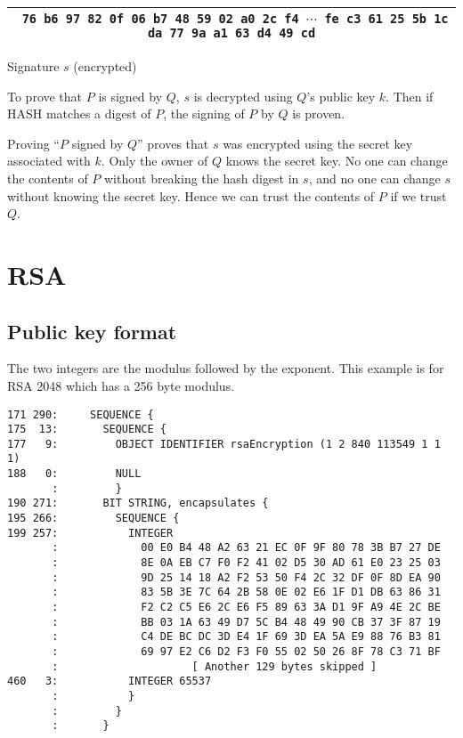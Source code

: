 \documentclass[12pt]{article}
\begin{document}
\begin{center}
\begin{tabular}{|c|}
\hline
{\footnotesize\tt
76 b6 97 82 0f 06 b7 48 59 02 a0 2c f4 $\cdots$
fe c3 61 25 5b 1c da 77 9a a1 63 d4 49 cd}\\
\hline
\end{tabular}

\medskip
Signature $s$ (encrypted)
\end{center}

\noindent
To prove that $P$ is signed by $Q$, $s$ is decrypted using $Q$'s public key $k$.
Then if HASH matches a digest of $P$, the signing of $P$ by $Q$ is proven.

\bigskip
\noindent
Proving ``$P$ signed by $Q$'' proves that $s$ was encrypted using the secret key associated with $k$.
Only the owner of $Q$ knows the secret key.
No one can change the contents of $P$ without breaking the hash digest in $s$,
and no one can change $s$ without knowing the secret key.
Hence we can trust the contents of $P$ if we trust $Q$.

\newpage
\section{RSA}

\subsection{Public key format}

\noindent
The two integers are the modulus followed by the exponent.
This example is for RSA 2048 which has a 256 byte modulus.

\begin{verbatim}
171 290:     SEQUENCE {
175  13:       SEQUENCE {
177   9:         OBJECT IDENTIFIER rsaEncryption (1 2 840 113549 1 1 1)
188   0:         NULL
       :         }
190 271:       BIT STRING, encapsulates {
195 266:         SEQUENCE {
199 257:           INTEGER
       :             00 E0 B4 48 A2 63 21 EC 0F 9F 80 78 3B B7 27 DE
       :             8E 0A EB C7 F0 F2 41 02 D5 30 AD 61 E0 23 25 03
       :             9D 25 14 18 A2 F2 53 50 F4 2C 32 DF 0F 8D EA 90
       :             83 5B 3E 7C 64 2B 58 0E 02 E6 1F D1 DB 63 86 31
       :             F2 C2 C5 E6 2C E6 F5 89 63 3A D1 9F A9 4E 2C BE
       :             BB 03 1A 63 49 D7 5C B4 48 49 90 CB 37 3F 87 19
       :             C4 DE BC DC 3D E4 1F 69 3D EA 5A E9 88 76 B3 81
       :             69 97 E2 C6 D2 F3 F0 55 02 50 26 8F 78 C3 71 BF
       :                     [ Another 129 bytes skipped ]
460   3:           INTEGER 65537
       :           }
       :         }
       :       }
\end{verbatim}
\end{document}
